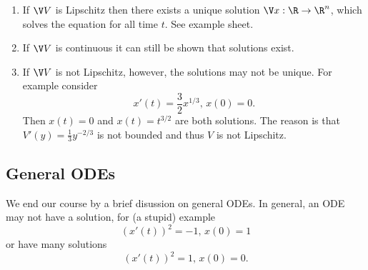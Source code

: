 \documentclass[a4paper]{article}
\theoremstyle{definition}
\begin{document}
\begin{remark}\leavevmode
  \begin{enumerate}
  \item If \(\V V\) is Lipschitz then there exists a unique solution \(\V x: \R \to \R^n\), which solves the equation for all time \(t\). See example sheet.
  \item If \(\V V\) is continuous it can still be shown that solutions exist.
  \item If \(\V V\) is not Lipschitz, however, the solutions may not be unique. For example consider
    \[
      x'(t) = \frac{3}{2}x^{1/3}, \, x(0) = 0.
    \]
    Then \(x(t) = 0\) and \(x(t) = t^{3/2}\) are both solutions. The reason is that \(V'(y) = \frac{1}{3} y^{-2/3}\) is not bounded and thus \(V\) is not Lipschitz.
  \end{enumerate}
\end{remark}

\subsection{General ODEs}

We end our course by a brief disussion on general ODEs. In general, an ODE may not have a solution, for (a stupid) example
\[
  (x'(t))^2 = -1, \, x(0) = 1
\]
or have many solutions
\[
  (x'(t))^2 = 1, \, x(0) = 0.
\]
\end{document}
